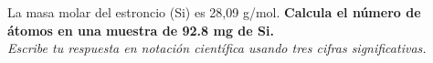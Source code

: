 La masa molar del estroncio (Si) es 28,09 g/mol.
\textbf{Calcula el número de átomos en una muestra de 92.8 mg de Si.}\\
\emph{Escribe tu respuesta en notación científica usando tres cifras significativas.}